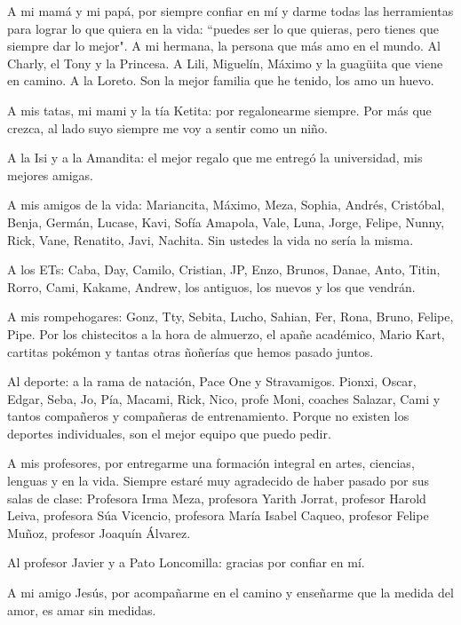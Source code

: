 A mi mamá y mi papá, por siempre confiar en mí y darme todas las herramientas para lograr lo que quiera en la vida: ``puedes ser lo que quieras, pero tienes que siempre dar lo mejor". A mi hermana, la persona que más amo en el mundo. Al Charly, el Tony y la Princesa. A Lili, Miguelín, Máximo y la guagüita que viene en camino. A la Loreto. Son la mejor familia que he tenido, los amo un huevo.

A mis tatas, mi mami y la tía Ketita: por regalonearme siempre. Por más que crezca, al lado suyo siempre me voy a sentir como un niño.


A la Isi y a la Amandita: el mejor regalo que me entregó la universidad, mis mejores amigas.

A mis amigos de la vida: Mariancita, Máximo, Meza, Sophia, Andrés, Cristóbal, Benja, Germán, Lucase, Kavi, Sofía Amapola, Vale, Luna, Jorge, Felipe, Nunny, Rick, Vane, Renatito, Javi, Nachita. Sin ustedes la vida no sería la misma.

A los ETs: Caba, Day, Camilo, Cristian, JP, Enzo, Brunos, Danae, Anto, Titin, Rorro, Cami, Kakame, Andrew, los antiguos, los nuevos y los que vendrán.

A mis rompehogares: Gonz, Tty, Sebita, Lucho, Sahian, Fer, Rona, Bruno, Felipe, Pipe. Por los chistecitos a la hora de almuerzo, el apañe académico, Mario Kart, cartitas pokémon y tantas otras ñoñerías que hemos pasado juntos.

Al deporte: a la rama de natación, Pace One y Stravamigos. Pionxi, Oscar, Edgar, Seba, Jo, Pía, Macami, Rick, Nico, profe Moni, coaches Salazar, Cami y tantos compañeros y compañeras de entrenamiento. Porque no existen los deportes individuales, son el mejor equipo que puedo pedir.

A mis profesores, por entregarme una formación integral en artes, ciencias, lenguas y en la vida. Siempre estaré muy agradecido de haber pasado por sus salas de clase: Profesora Irma Meza, profesora Yarith Jorrat, profesor Harold Leiva, profesora Súa Vicencio, profesora María Isabel Caqueo, profesor Felipe Muñoz, profesor Joaquín Álvarez.

Al profesor Javier y a Pato Loncomilla: gracias por confiar en mí.


A mi amigo Jesús, por acompañarme en el camino y enseñarme que la medida del amor, es amar sin medidas.
